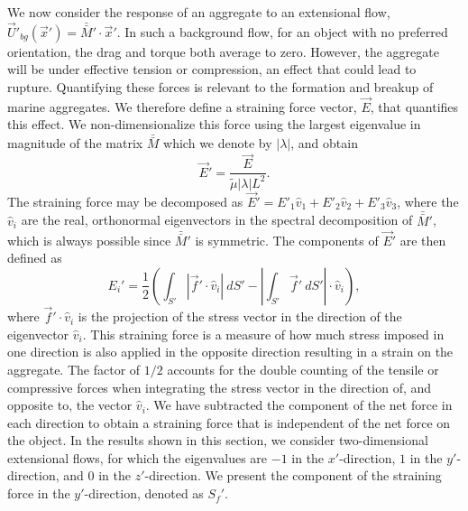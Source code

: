 We now consider the response of an aggregate to  an extensional flow, $\vec{U}'_{bg}(\vec{x}') = \bar{\bar{M}}' \cdot \vec{x}'$. In such a background flow, for an object with no preferred orientation, the drag and torque both average to zero. However, the aggregate will be under effective tension or compression, an effect that could lead to rupture. Quantifying these forces is relevant to the formation and breakup of marine aggregates. 
We therefore define a straining force vector, $\vec{E}$, that quantifies this effect. 
We non-dimensionalize this force using the largest eigenvalue in magnitude of the matrix $\bar{\bar{M}}$ which we denote by $|\lambda|$, and obtain  
\begin{equation}
\vec{E}' = \frac{\vec{E}}{\tilde{\mu} |\lambda| L^2}.
\label{eq_Sf1}
\end{equation}
The straining force may be decomposed as 
$\vec{E}' = E'_{1} \hat{v}_1 + E'_{2} \hat{v}_2 + E'_{3} \hat{v}_3$, where the $\hat{v}_i$ are the real, orthonormal eigenvectors in the spectral decomposition of $\bar{\bar{M}}'$, which is always possible since $\bar{\bar{M}}'$ is symmetric. 
The components of $\vec{E}'$ are  then defined as
\begin{equation}
E_i' = \frac{1}{2} \left( \int_{S'} | \vec{f}' \cdot \hat{v}_i | \ dS' - \left| \int_{S'} \vec{f}' \ dS' \right|  \cdot \hat{v}_i \right), 
\label{eq_Sf2}
\end{equation}
where $\vec{f}' \cdot \hat{v}_i$ is the projection of the stress vector in the direction of the eigenvector $\hat{v}_i$. 
This straining force is a measure of how much stress imposed in one direction is also applied in the opposite direction resulting in a strain on the aggregate. The factor of $1/2$ accounts for the double counting of the tensile or compressive forces when integrating the stress vector in the direction of, and opposite to, the vector $\hat{v}_i$. We have subtracted the component of the net force in each direction to obtain a straining force that is independent of the net force on the object. In the results shown in this section, we consider two-dimensional extensional flows, for which the eigenvalues are $-1$ in the $x'$-direction, $1$ in the $y'$-direction, and  0 in the $z'$-direction. We present the component of the straining force in the $y'$-direction, denoted as $S_f'$.


